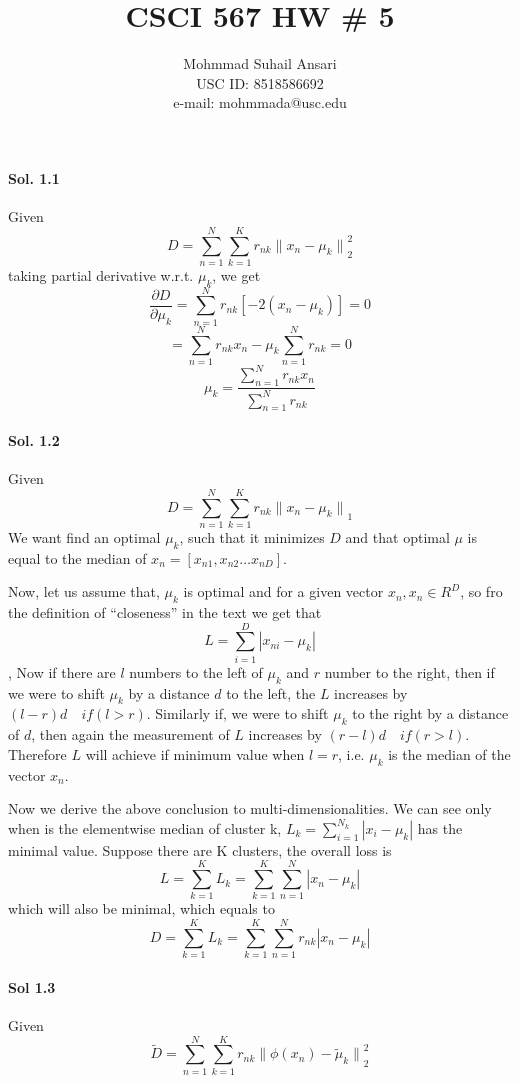 \documentclass[]{report}
\title{CSCI 567 HW \# 5}
\author{Mohmmad Suhail Ansari \\ USC ID: 8518586692\\e-mail: mohmmada@usc.edu}
\begin{document}
\maketitle

\paragraph{Sol. 1.1}
	Given 
	\[ D = \sum_{n=1}^N \sum_{k=1}^K r_{nk}  {\| x_n - \mu_k \|}_2^2 \]
	taking partial derivative w.r.t. $\mu_k$, we get 
	\[ \frac{\partial{D}}{\partial{\mu_k}} = \sum_{n=1}^N r_{nk} [-2 (x_n - \mu_k)] = 0 \]
	\[ = \sum_{n=1}^N r_{nk} x_n - \mu_k \sum_{n=1}^N r_{nk} = 0\]
	\[ \mu_k = \frac{\sum_{n=1}^N r_{nk} x_n}{\sum_{n=1}^N r_{nk}}\]

\paragraph{Sol. 1.2}
	Given 
	\[ D = \sum_{n=1}^N \sum_{k=1}^K r_{nk}  {\| x_n - \mu_k \|}_1 \]
	We want find an optimal $\mu_k$, such that it minimizes $D$ and that optimal $\mu$ is equal to the 
	median of $x_n = [x_{n1}, x_{n2} \hdots x_{nD}]$.

	Now, let us assume that, $\mu_k$ is optimal and for a given vector $x_n, x_n \in R^D$, so fro the definition of 
	``closeness'' in the text we get that 
	\[ L = \sum_{i=1}^D |x_{ni} - \mu_k|\],
	Now if there are $l$ numbers to the left of $\mu_k$ and $r$ number to the right, then if we were to shift $\mu_k$ by a distance $d$
	to the left, the $L$ increases by $(l - r)d \quad if(l > r)$. Similarly if, we were to shift $\mu_k$ to the right by a distance of $d$, then again the 
	measurement of $L$ increases by $(r - l)d \quad if (r > l)$. Therefore $L$ will achieve if minimum value when $l = r$, i.e. $\mu_k$ is the median of the 
	vector $x_n$.


	Now we derive the above conclusion to multi-dimensionalities. We can see only when  is the elementwise median of cluster k, $L_k = \sum_{i=1}^{N_k} |x_i - \mu_k |$ has the minimal value. Suppose there are K clusters, the overall loss is
	\[ L = \sum_{k=1}^K L_k = \sum_{k=1}^K \sum_{n=1}^N |x_n - \mu_k| \]  
	which will also be minimal, which equals to 
	\[ D = \sum_{k=1}^K L_k = \sum_{k=1}^K \sum_{n=1}^N r_{nk} |x_n - \mu_k| \]  

\paragraph{Sol 1.3}
	Given
	\begin{equation}
		\tilde{D} = \sum_{n=1}^N \sum_{k=1}^K r_{nk} {\| \phi (x_n) - \tilde{\mu}_k \|}_2^2 
	\end{equation}
\end{document}
